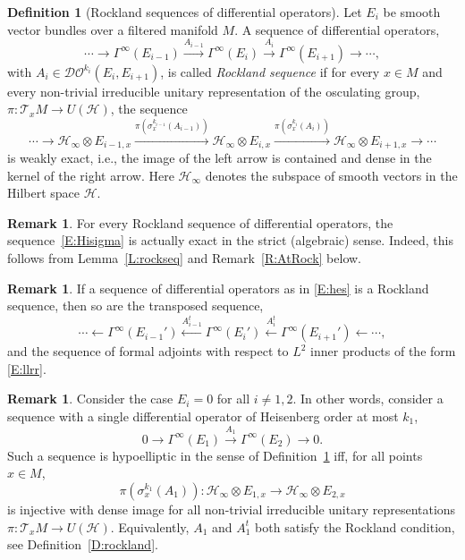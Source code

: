\documentclass[reqno,12pt]{amsart}
\newcommand{\DO}{\mathcal D\mathcal O}
\theoremstyle{plain}
\theoremstyle{definition}
\newtheorem{definition}[theorem]{Definition}
\newtheorem{remark}[theorem]{Remark}
\begin{document}
\begin{definition}[Rockland sequences of differential operators]\label{def.Hypo-seq}
Let $E_i$ be smooth vector bundles over a filtered manifold $M$.
A sequence of differential operators,
\begin{equation}\label{E:hes}
\cdots\to\Gamma^\infty(E_{i-1})\xrightarrow{A_{i-1}}\Gamma^\infty(E_i)\xrightarrow{A_i}\Gamma^\infty(E_{i+1})\to\cdots,
\end{equation}
with $A_i\in\DO^{k_i}(E_i,E_{i+1})$, is called \emph{Rockland sequence} if
for every $x\in M$ and every non-trivial irreducible unitary representation of the osculating group, $\pi\colon\mathcal T_xM\to U(\mathcal H)$, the sequence
\begin{equation}\label{E:Hisigma}
\cdots\to
\mathcal H_\infty\otimes E_{i-1,x}\xrightarrow{\pi(\sigma^{k_{i-1}}_x(A_{i-1}))}
\mathcal H_\infty\otimes E_{i,x}\xrightarrow{\pi(\sigma^{k_i}_x(A_i))}
\mathcal H_\infty\otimes E_{i+1,x}\to\cdots
\end{equation}
is weakly exact, i.e., the image of the left arrow is contained and dense in the kernel of the right arrow.
Here $\mathcal H_\infty$ denotes the subspace of smooth vectors in the Hilbert space $\mathcal H$.
\end{definition}


\begin{remark}\label{R:weakexactness}
For every Rockland sequence of differential operators, the sequence~\eqref{E:Hisigma} is actually exact in the strict (algebraic) sense.
Indeed, this follows from Lemma~\ref{L:rockseq} and Remark~\ref{R:AtRock} below.
\end{remark}


\begin{remark}\label{R:transposedseq}
If a sequence of differential operators as in \eqref{E:hes} is a Rockland sequence, then so are the transposed sequence,
$$
\cdots\leftarrow\Gamma^\infty(E_{i-1}')\xleftarrow{A_{i-1}^t}\Gamma^\infty(E_i')\xleftarrow{A_i^t}\Gamma^\infty(E_{i+1}')\leftarrow\cdots,
$$
and the sequence of formal adjoints with respect to $L^2$ inner products of the form \eqref{E:llrr}.
\end{remark}


\begin{remark}
Consider the case $E_i=0$ for all $i\neq1,2$.
In other words, consider a sequence with a single differential operator of Heisenberg order at most $k_1$,
$$
0\to\Gamma^\infty(E_1)\xrightarrow{A_1}\Gamma^\infty(E_2)\to0.
$$
Such a sequence is hypoelliptic in the sense of Definition~\ref{def.Hypo-seq} iff, for all points $x\in M$,
$$
\pi(\sigma^{k_1}_x(A_1))\colon\mathcal H_\infty\otimes E_{1,x}\to\mathcal H_\infty\otimes E_{2,x}
$$ 
is injective with dense image for all non-trivial irreducible unitary representations $\pi\colon\mathcal T_xM\to U(\mathcal H)$.
Equivalently, $A_1$ and $A_1^t$ both satisfy the Rockland condition, see Definition~\ref{D:rockland}.
\end{remark}
\end{document}
